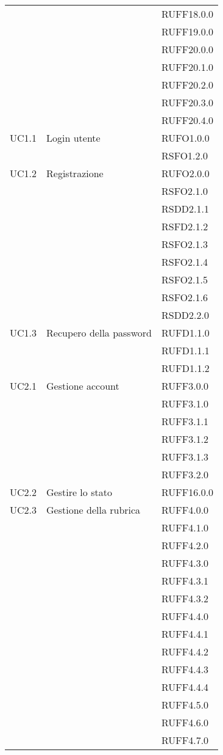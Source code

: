 \begin{center}
\begin{longtable}{lp{}l}
 &  & RUFF18.0.0 \\
 &  & RUFF19.0.0 \\
 &  & RUFF20.0.0 \\
 &  & RUFF20.1.0 \\
 &  & RUFF20.2.0 \\
 &  & RUFF20.3.0 \\
 &  & RUFF20.4.0 \\
UC1.1 & Login utente & RUFO1.0.0 \\
 &  & RSFO1.2.0 \\
UC1.2 & Registrazione & RUFO2.0.0 \\
 &  & RSFO2.1.0 \\
 &  & RSDD2.1.1 \\
 &  & RSFD2.1.2 \\
 &  & RSFO2.1.3 \\
 &  & RSFO2.1.4 \\
 &  & RSFO2.1.5 \\
 &  & RSFO2.1.6 \\    
 &  & RSDD2.2.0 \\
UC1.3 & Recupero della password & RUFD1.1.0 \\
 &  & RUFD1.1.1 \\
 &  & RUFD1.1.2 \\
UC2.1 & Gestione account & RUFF3.0.0 \\
 &  & RUFF3.1.0 \\
 &  & RUFF3.1.1 \\
 &  & RUFF3.1.2 \\
 &  & RUFF3.1.3 \\
 &  & RUFF3.2.0 \\
UC2.2 & Gestire lo stato & RUFF16.0.0 \\
UC2.3 & Gestione della rubrica & RUFF4.0.0 \\
 &  & RUFF4.1.0 \\
 &  & RUFF4.2.0 \\
 &  & RUFF4.3.0 \\
 &  & RUFF4.3.1 \\
 &  & RUFF4.3.2 \\
 &  & RUFF4.4.0 \\
 &  & RUFF4.4.1 \\
 &  & RUFF4.4.2 \\
 &  & RUFF4.4.3 \\
 &  & RUFF4.4.4 \\
 &  & RUFF4.5.0 \\
 &  & RUFF4.6.0 \\
 &  & RUFF4.7.0 \\

\end{longtable}
\end{center}
